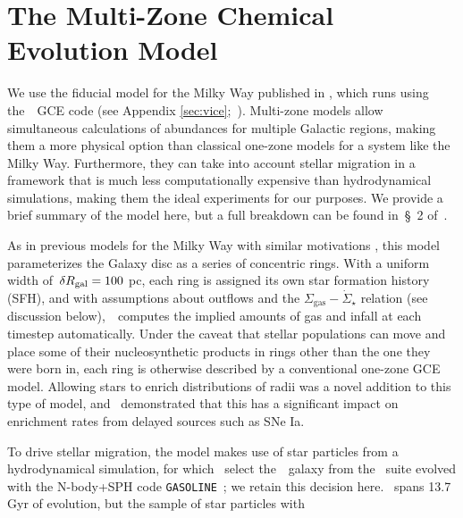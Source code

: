 \documentclass[ms.tex]{subfiles}
\begin{document}
\section{The Multi-Zone Chemical Evolution Model}
\label{sec:multizone}

We use the fiducial model for the Milky Way published in
\citet{Johnson2021}, which runs using the~\vice~GCE code (see Appendix
\ref{sec:vice};~\citealp{Johnson2020, Griffith2021a}).
Multi-zone models allow simultaneous calculations of abundances for multiple
Galactic regions, making them a more physical option than classical one-zone
models for a system like the Milky Way.
Furthermore, they can take into account stellar migration in a framework that
is much less computationally expensive than hydrodynamical simulations, making
them the ideal experiments for our purposes.
We provide a brief summary of the model here, but a full breakdown can be found
in~\S~2 of~\citet{Johnson2021}.
\par
As in previous models for the Milky Way with similar motivations
\citep[e.g.][]{Matteucci1989, Schoenrich2009, Minchev2013, Minchev2014,
Minchev2017, Sharma2021}, this model parameterizes the Galaxy disc as a series
of concentric rings.
With a uniform width of~$\delta R_\text{gal} = 100$ pc, each ring is assigned its own
star formation history (SFH), and with assumptions about outflows and the
$\Sigma_\text{gas}-\dot{\Sigma}_\star$ relation (see discussion
below),~\vice~computes the implied amounts of gas and infall at each timestep
automatically.
Under the caveat that stellar populations can move and place some of their
nucleosynthetic products in rings other than the one they were born in, each
ring is otherwise described by a conventional one-zone GCE model.
Allowing stars to enrich distributions of radii was a novel addition to this
type of model, and~\citet{Johnson2021} demonstrated that this has a
significant impact on enrichment rates from delayed sources such as SNe Ia.
\par
To drive stellar migration, the model makes use of star particles from a
hydrodynamical simulation, for which~\citet{Johnson2021} select the~\hsim~galaxy
from the~\citet{Christensen2012} suite evolved with the N-body+SPH code
\texttt{GASOLINE}~\citep{Wadsley2004}; we retain this decision here.
\hsim~spans 13.7 Gyr of evolution, but the sample of star particles with
\end{document}
